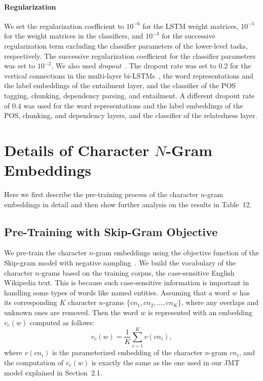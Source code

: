 \documentclass[11pt,a4paper]{article}
\begin{document}
\paragraph{Regularization}
We set the regularization coefficient to $10^{-6}$ for the LSTM weight matrices, $10^{-5}$ for the weight matrices in the classifiers, and $10^{-3}$ for the successive regularization term excluding the classifier parameters of the lower-level tasks, respectively.
The successive regularization coefficient for the classifier parameters was set to $10^{-2}$.
We also used {\it dropout}~\citep{dropout2014ver}.
The dropout rate was set to 0.2 for the vertical connections in the multi-layer bi-LSTMs~\citep{pham2015dropout}, the word representations and the label embeddings of the entailment layer, and the classifier of the POS tagging, chunking, dependency parsing, and entailment.
A different dropout rate of 0.4 was used for the word representations and the label embeddings of the POS, chunking, and dependency layers, and the classifier of the relatedness layer.

\section{Details of Character $N$-Gram Embeddings}
\label{sec:char_detail}

Here we first describe the pre-training process of the character $n$-gram embeddings in detail and then show further analysis on the results in Table~12.

\subsection{Pre-Training with Skip-Gram Objective}
We pre-train the character $n$-gram embeddings using the objective function of the Skip-gram model with negative sampling~\citep{mikolov2013word2vec}.
We build the vocabulary of the character $n$-grams based on the training corpus, the case-sensitive English Wikipedia text.
This is because such case-sensitive information is important in handling some types of words like named entities.
Assuming that a word $w$ has its corresponding $K$ character $n$-grams $\{cn_1, cn_2, \ldots, cn_K\}$, where any overlaps and unknown ones are removed.
Then the word $w$ is represented with an embedding $v_c(w)$ computed as follows:
\begin{equation}
v_c(w)=\frac{1}{K}\sum_{i=1}^{K}v(cn_i),
\end{equation}
where $v(cn_i)$ is the parameterized embedding of the character $n$-gram $cn_i$, and the computation of $v_c(w)$ is exactly the same as the one used in our JMT model explained in Section~2.1.
\end{document}
